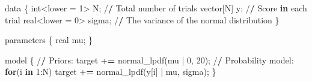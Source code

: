 \documentclass[
  english,
  doc,floatsintext]{apa6}
\newenvironment{Shaded}{\begin{snugshade}}{\end{snugshade}}
\newcommand{\ControlFlowTok}[1]{\textcolor[rgb]{0.13,0.29,0.53}{\textbf{#1}}}
\newcommand{\DecValTok}[1]{\textcolor[rgb]{0.00,0.00,0.81}{#1}}
\newcommand{\ErrorTok}[1]{\textcolor[rgb]{0.64,0.00,0.00}{\textbf{#1}}}
\newcommand{\FunctionTok}[1]{\textcolor[rgb]{0.00,0.00,0.00}{#1}}
\newcommand{\NormalTok}[1]{#1}
\newcommand{\OtherTok}[1]{\textcolor[rgb]{0.56,0.35,0.01}{#1}}
\newcommand{\SpecialCharTok}[1]{\textcolor[rgb]{0.00,0.00,0.00}{#1}}
\begin{document}
\scriptsize

\begin{Shaded}
\begin{Highlighting}[]
\NormalTok{data \{}
\NormalTok{  int}\SpecialCharTok{\textless{}}\NormalTok{lower }\OtherTok{=} \DecValTok{1}\SpecialCharTok{\textgreater{}}\NormalTok{ N;             }\SpecialCharTok{/}\ErrorTok{/}\NormalTok{ Total number of trials }
\NormalTok{  vector[N] y;                  }\SpecialCharTok{/}\ErrorTok{/}\NormalTok{ Score }\ControlFlowTok{in}\NormalTok{ each trial }
\NormalTok{  real}\SpecialCharTok{\textless{}}\NormalTok{lower }\OtherTok{=} \DecValTok{0}\SpecialCharTok{\textgreater{}}\NormalTok{ sigma;        }\SpecialCharTok{/}\ErrorTok{/}\NormalTok{ The variance of the normal distribution }
\NormalTok{\}}

\NormalTok{parameters \{}
\NormalTok{  real mu; }
\NormalTok{\}}

\NormalTok{model \{}
  \SpecialCharTok{/}\ErrorTok{/}\NormalTok{ Priors}\SpecialCharTok{:} 
\NormalTok{  target }\SpecialCharTok{+}\ErrorTok{=} \FunctionTok{normal\_lpdf}\NormalTok{(mu }\SpecialCharTok{|} \DecValTok{0}\NormalTok{, }\DecValTok{20}\NormalTok{);}
  \SpecialCharTok{/}\ErrorTok{/}\NormalTok{ Probability model}\SpecialCharTok{:} 
  \ControlFlowTok{for}\NormalTok{(i }\ControlFlowTok{in} \DecValTok{1}\SpecialCharTok{:}\NormalTok{N)}
\NormalTok{    target }\SpecialCharTok{+}\ErrorTok{=} \FunctionTok{normal\_lpdf}\NormalTok{(y[i] }\SpecialCharTok{|}\NormalTok{ mu, sigma);}
\NormalTok{\}}
\end{Highlighting}
\end{Shaded}

\normalsize
\end{document}
